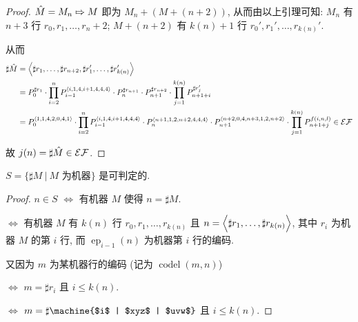 \begin{solution}
\begin{proof}
$\hat{M} = M_n \concat M$ 即为 $M_n + (M + (n+2))$, 从而由以上引理可知: $M_n$ 有 $n+3$ 行 $r_0, r_1, \dots, r_n+2$; $M+(n+2)$ 有 $k(n)+1$ 行 $r_0', r_1', \dots, r_{k(n)}'$.

从而 \begin{align*}
\sharp \hat{M} & = \left \langle \sharp r_1, \dots, \sharp r_{n+2}, \sharp r_1', \dots, \sharp r_{k(n)}' \right \rangle \\
& = P_0^{\sharp r_1} \cdot \prod_{i = 2}^n P_{i-1}^{\left \langle i,1,4,i+1,4,4,4 \right \rangle} \cdot P_n^{\sharp r_{n+1}} \cdot P_{n+1}^{\sharp r_{n+2}} \cdot \prod_{j=1}^{k(n)} P_{n+1+i}^{\sharp r_j'} \\
& = P_0^{\left \langle 1,1,4,2,0,4,1 \right \rangle} \cdot \prod_{i=2}^n P_{i-1}^{\left \langle i,1,4,i+1,4,4,4 \right \rangle} \cdot P_{n}^{\left \langle n+1,1,2,n+2,4,4,4 \right \rangle} \cdot P_{n+1}^{\left \langle n+2,0,4,n+3,1,2,n+2 \right \rangle} \cdot \prod_{j=1}^{k(n)} P_{n+1+j}^{f(i,n,l)} \in \mathcal{EF}
\end{align*}

故 $j(n) = \sharp \hat{M} \in \mathcal{EF}$.
\end{proof}

\begin{lemma}
$S = \{ \sharp M ~ | ~ M \text{ 为机器} \}$ 是可判定的.
\end{lemma}

\begin{proof}
$n \in S$ $\Leftrightarrow$ 有机器 $M$ 使得 $n = \sharp M$.

$\Leftrightarrow$ 有机器 $M$ 有 $k(n)$ 行 $r_0, r_1, \dots, r_{k(n)}$ 且 $n = \left \langle \sharp r_1, \dots, \sharp r_{k(n)} \right \rangle$, 其中 $r_i$ 为机器 $M$ 的第 $i$ 行, 而 $\operatorname{ep}_{i-1}(n)$ 为机器第 $i$ 行的编码.

又因为 $m$ 为某机器行的编码 (记为 $\operatorname{codel}(m,n)$) 

$\Leftrightarrow$ $m = \sharp r_i$ 且 $i \le k(n)$.

$\Leftrightarrow$ $m = \sharp \machine{$i$ | $xyz$ | $uvw$}$ 且 $i \le k(n)$.


\end{proof}
\end{solution}

